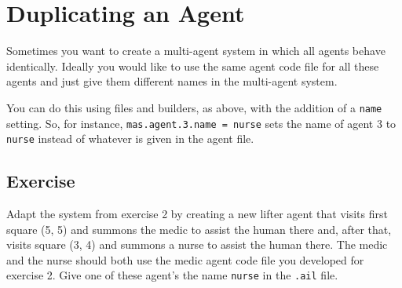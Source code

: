 \section{Duplicating an Agent}

Sometimes you want to create a multi-agent system in which all agents behave identically.  Ideally you would like to use the same agent code file for all these agents and just give them different names in the multi-agent system.

You can do this using files and builders, as above, with the addition of a \texttt{name} setting.  So, for instance, \texttt{mas.agent.3.name = nurse} sets the name of agent 3 to \texttt{nurse} instead of whatever is given in the agent file.

\subsection{Exercise}
Adapt the system from exercise 2 by creating a new lifter agent that visits first square (5, 5) and summons the medic to assist the human there and, after that, visits square (3, 4) and summons a nurse to assist the human there.  The medic and the nurse should both use the medic agent code file you developed for exercise 2.  Give one of these agent's the name \texttt{nurse} in the \texttt{.ail} file.

